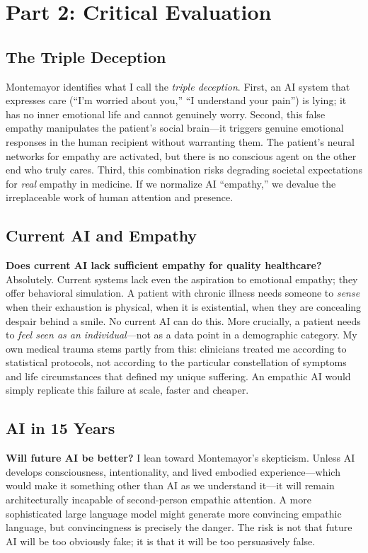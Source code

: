 \documentclass[12pt,twoside]{article}
\begin{document}
\section*{Part 2: Critical Evaluation}

\subsection*{The Triple Deception}

Montemayor identifies what I call the \textit{triple deception}. First, an AI system that expresses care (``I'm worried about you,'' ``I understand your pain'') is lying; it has no inner emotional life and cannot genuinely worry. Second, this false empathy manipulates the patient's social brain---it triggers genuine emotional responses in the human recipient without warranting them. The patient's neural networks for empathy are activated, but there is no conscious agent on the other end who truly cares. Third, this combination risks degrading societal expectations for \textit{real} empathy in medicine. If we normalize AI ``empathy,'' we devalue the irreplaceable work of human attention and presence.

\subsection*{Current AI and Empathy}

\textbf{Does current AI lack sufficient empathy for quality healthcare?} Absolutely. Current systems lack even the aspiration to emotional empathy; they offer behavioral simulation. A patient with chronic illness needs someone to \textit{sense} when their exhaustion is physical, when it is existential, when they are concealing despair behind a smile. No current AI can do this. More crucially, a patient needs to \textit{feel seen as an individual}---not as a data point in a demographic category. My own medical trauma stems partly from this: clinicians treated me according to statistical protocols, not according to the particular constellation of symptoms and life circumstances that defined my unique suffering. An empathic AI would simply replicate this failure at scale, faster and cheaper.

\subsection*{AI in 15 Years}

\textbf{Will future AI be better?} I lean toward Montemayor's skepticism. Unless AI develops consciousness, intentionality, and lived embodied experience---which would make it something other than AI as we understand it---it will remain architecturally incapable of second-person empathic attention. A more sophisticated large language model might generate more convincing empathic language, but convincingness is precisely the danger. The risk is not that future AI will be too obviously fake; it is that it will be too persuasively false.
\end{document}
